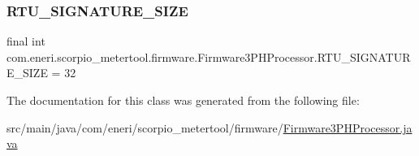 \subsubsection{\texorpdfstring{R\+T\+U\+\_\+\+S\+I\+G\+N\+A\+T\+U\+R\+E\+\_\+\+S\+I\+ZE}{RTU\_SIGNATURE\_SIZE}}
{\footnotesize\ttfamily final int com.\+eneri.\+scorpio\+\_\+metertool.\+firmware.\+Firmware3\+P\+H\+Processor.\+R\+T\+U\+\_\+\+S\+I\+G\+N\+A\+T\+U\+R\+E\+\_\+\+S\+I\+ZE = 32\hspace{0.3cm}{\ttfamily [static]}}



The documentation for this class was generated from the following file\+:\begin{DoxyCompactItemize}
\item 
src/main/java/com/eneri/scorpio\+\_\+metertool/firmware/\hyperlink{_firmware3_p_h_processor_8java}{Firmware3\+P\+H\+Processor.\+java}\end{DoxyCompactItemize}
